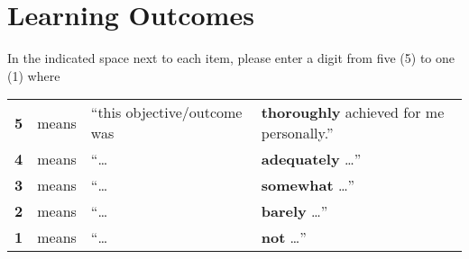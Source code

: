 \documentclass[handout]{mcs}
\begin{document}
\section*{Learning Outcomes}

In the indicated space next to each item, please enter a digit from five
(5) to one (1) where

\begin{center}
\begin{tabular}{rcll}
\hline
\textbf{5} & means &  ``this objective/outcome was & \textbf{thoroughly}
achieved for me personally.''\\
\textbf{4} & means &  ``\dots & \textbf{adequately} \dots''\\
\textbf{3} & means &  ``\dots & \textbf{somewhat} \dots''\\
\textbf{2} & means &  ``\dots & \textbf{barely} \dots''\\
\textbf{1} & means &  ``\dots & \textbf{not} \dots''\\
\hline
\end{tabular}
\end{center}
\fi
\end{document}
